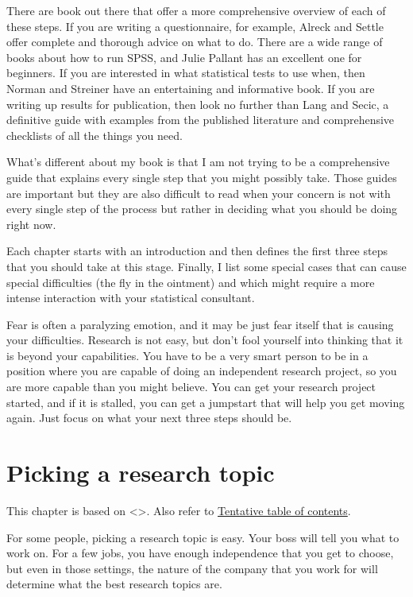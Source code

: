 \documentclass[
  letterpaper,
  DIV=11,
  numbers=noendperiod]{scrreprt}
\begin{document}
There are book out there that offer a more comprehensive overview of
each of these steps. If you are writing a questionnaire, for example,
Alreck and Settle offer complete and thorough advice on what to do.
There are a wide range of books about how to run SPSS, and Julie Pallant
has an excellent one for beginners. If you are interested in what
statistical tests to use when, then Norman and Streiner have an
entertaining and informative book. If you are writing up results for
publication, then look no further than Lang and Secic, a definitive
guide with examples from the published literature and comprehensive
checklists of all the things you need.

What's different about my book is that I am not trying to be a
comprehensive guide that explains every single step that you might
possibly take. Those guides are important but they are also difficult to
read when your concern is not with every single step of the process but
rather in deciding what you should be doing right now.

Each chapter starts with an introduction and then defines the first
three steps that you should take at this stage. Finally, I list some
special cases that can cause special difficulties (the fly in the
ointment) and which might require a more intense interaction with your
statistical consultant.

Fear is often a paralyzing emotion, and it may be just fear itself that
is causing your difficulties. Research is not easy, but don't fool
yourself into thinking that it is beyond your capabilities. You have to
be a very smart person to be in a position where you are capable of
doing an independent research project, so you are more capable than you
might believe. You can get your research project started, and if it is
stalled, you can get a jumpstart that will help you get moving again.
Just focus on what your next three steps should be.


\chapter{Picking a research topic}\label{picking-a-research-topic}

This chapter is based on \textless{}\textgreater. Also refer to
\href{http://www.pmean.com/10/Contents.html}{Tentative table of
contents}.

For some people, picking a research topic is easy. Your boss will tell
you what to work on. For a few jobs, you have enough independence that
you get to choose, but even in those settings, the nature of the company
that you work for will determine what the best research topics are.
\end{document}
